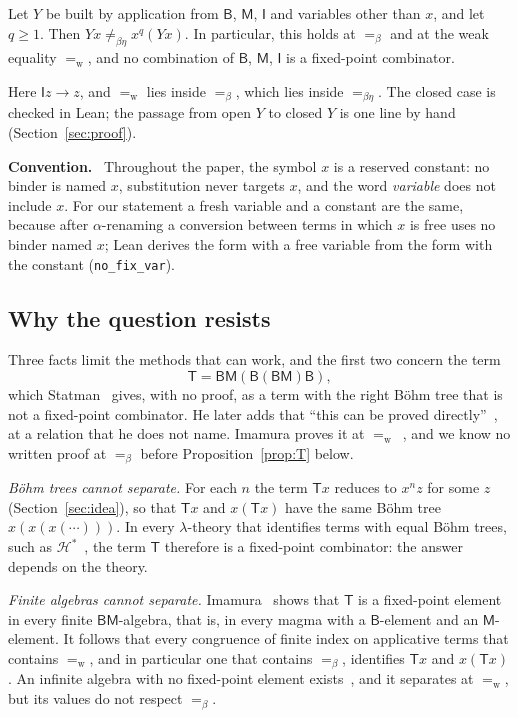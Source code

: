 \documentclass[a4paper,english]{lipics-v2021}
\newcommand{\B}{\mathsf{B}}
\newcommand{\M}{\mathsf{M}}
\newcommand{\I}{\mathsf{I}}
\newcommand{\T}{\mathsf{T}}
\newcommand{\eqw}{=_{\mathrm{w}}}
\newcommand{\eqb}{=_{\beta}}
\newcommand{\eqbe}{=_{\beta\eta}}
\newcommand{\neqbe}{\neq_{\beta\eta}}
\newcommand{\lean}[1]{\texttt{#1}}
\newcommand{\runin}[1]{\par\smallskip\noindent\textbf{#1}\ }
\begin{document}
\begin{theorem}\label{thm:main}
Let $Y$ be built by application from $\B$, $\M$, $\I$ and variables other than $x$, and let $q \geq 1$. Then $Yx \neqbe x^q(Yx)$. In particular, this holds at $\eqb$ and at the weak equality $\eqw$, and no combination of $\B$, $\M$, $\I$ is a fixed-point combinator.
\end{theorem}

Here $\I z \to z$, and $\eqw$ lies inside $\eqb$, which lies inside $\eqbe$. The closed case is checked in Lean; the passage from open $Y$ to closed $Y$ is one line by hand (Section~\ref{sec:proof}).

\runin{Convention.} Throughout the paper, the symbol $x$ is a reserved constant: no binder is named $x$, substitution never targets $x$, and the word \emph{variable} does not include $x$. For our statement a fresh variable and a constant are the same, because after $\alpha$-renaming a conversion between terms in which $x$ is free uses no binder named $x$; Lean derives the form with a free variable from the form with the constant (\lean{no\_fix\_var}).

\subsection{Why the question resists}\label{sec:hard}

Three facts limit the methods that can work, and the first two concern the term
\[
\T = \B\M(\B(\B\M)\B),
\]
which Statman~\cite[p.~442]{statman1993} gives, with no proof, as a term with the right Böhm tree that is not a fixed-point combinator. He later adds that ``this can be proved directly''~\cite[p.~2]{statman2011}\cite[p.~114]{statman2017}, at a relation that he does not name. Imamura proves it at $\eqw$~\cite[Section~4.2]{imamura1}, and we know no written proof at $\eqb$ before Proposition~\ref{prop:T} below.

\emph{Böhm trees cannot separate.} For each $n$ the term $\T x$ reduces to $x^nz$ for some $z$ (Section~\ref{sec:idea}), so that $\T x$ and $x(\T x)$ have the same Böhm tree $x(x(x(\cdots)))$. In every $\lambda$-theory that identifies terms with equal Böhm trees, such as $\mathcal{H}^*$~\cite{barendregt}, the term $\T$ therefore is a fixed-point combinator: the answer depends on the theory.

\emph{Finite algebras cannot separate.} Imamura~\cite[Theorem~4.22]{imamura2} shows that $\T$ is a fixed-point element in every finite $\B\M$-algebra, that is, in every magma with a $\B$-element and an $\M$-element. It follows that every congruence of finite index on applicative terms that contains $\eqw$, and in particular one that contains $\eqb$, identifies $\T x$ and $x(\T x)$. An infinite algebra with no fixed-point element exists~\cite[Theorem~0.5]{imamura2}, and it separates at $\eqw$, but its values do not respect $\eqb$.
\end{document}
